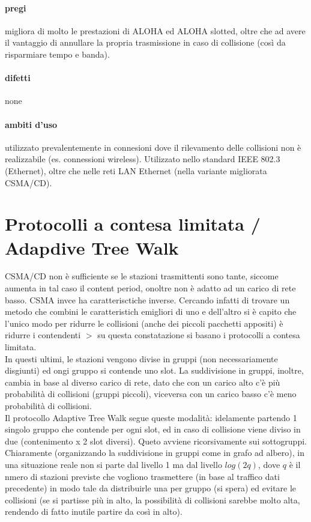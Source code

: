 \documentclass{article}
\begin{document}
\paragraph{pregi} migliora di molto le prestazioni di ALOHA ed ALOHA slotted,
oltre che ad avere il vantaggio di annullare la propria trasmissione in caso di
collisione (così da risparmiare tempo e banda).

\paragraph{difetti} none

\paragraph{ambiti d'uso} utilizzato prevalentemente in connesioni dove il
rilevamento delle collisioni non è realizzabile (es. connessioni wireless).
Utilizzato nello standard IEEE 802.3 (Ethernet), oltre che nelle reti LAN
Ethernet (nella variante migliorata CSMA/CD).

\section{Protocolli a contesa limitata / Adapdive Tree Walk}

CSMA/CD non è sufficiente se le stazioni trasmittenti sono tante, siccome
aumenta in tal caso il content period, onoltre non è adatto ad un carico di rete
basso. CSMA invce ha caratterisctiche inverse. Cercando infatti di trovare un
metodo che combini le caratteristich emigliori di uno e dell'altro si è capito
che l'unico modo per ridurre le collisioni (anche dei piccoli pacchetti
appositi) è ridurre i contendenti $>$ su questa constatazione si basano i
protocolli a contesa limitata.\\
In questi ultimi, le stazioni vengono divise in gruppi (non necessariamente
disgiunti) ed ongi gruppo si contende uno slot. La suddivisione in gruppi,
inoltre, cambia in base al diverso carico di rete, dato che con un carico alto
c'è più probabilità di collisioni (gruppi piccoli), viceversa con un carico
basso c'è meno probabilità di collisioni.\\
Il protocollo Adaptive Tree Walk segue queste modalità: idelamente partendo 1
singolo gruppo che contende per ogni slot, ed in caso di collisione viene diviso
in due (contenimento x 2 slot diversi). Queto avviene ricorsivamente sui
sottogruppi. Chiaramente (organizzando la suddivisione in gruppi come in grafo
ad albero), in una situazione reale non si parte dal livello 1 ma dal livello
$log(2q)$, dove $q$ è il nmero di stazioni previste che vogliono trasmettere (in
base al traffico dati precedente) in modo tale da distribuirle una per gruppo
(si spera) ed evitare le collisioni (se si partisse più in alto, la possibilità
di collisioni sarebbe molto alta, rendendo di fatto inutile partire da così in
alto).
\end{document}
